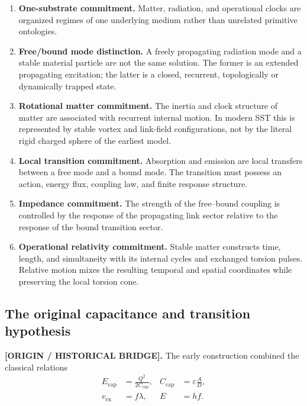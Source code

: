 \documentclass[11pt]{article}
\theoremstyle{definition}
\theoremstyle{plain}
\theoremstyle{remark}
\begin{document}
\begin{enumerate}
    \item \textbf{One-substrate commitment.}
    Matter, radiation, and operational clocks are organized regimes of one
    underlying medium rather than unrelated primitive ontologies.

    \item \textbf{Free/bound mode distinction.}
    A freely propagating radiation mode and a stable material particle are not
    the same solution. The former is an extended propagating excitation; the
    latter is a closed, recurrent, topologically or dynamically trapped state.

    \item \textbf{Rotational matter commitment.}
    The inertia and clock structure of matter are associated with recurrent
    internal motion. In modern SST this is represented by stable vortex and
    link-field configurations, not by the literal rigid charged sphere of the
    earliest model.

    \item \textbf{Local transition commitment.}
    Absorption and emission are local transfers between a free mode and a bound
    mode. The transition must possess an action, energy flux, coupling law, and
    finite response structure.

    \item \textbf{Impedance commitment.}
    The strength of the free--bound coupling is controlled by the response of
    the propagating link sector relative to the response of the bound
    transition sector.

    \item \textbf{Operational relativity commitment.}
    Stable matter constructs time, length, and simultaneity with its internal
    cycles and exchanged torsion pulses. Relative motion mixes the resulting
    temporal and spatial coordinates while preserving the local torsion cone.
\end{enumerate}

\subsection{The original capacitance and transition hypothesis}
\label{subsec:original_capacitance_transition_hypothesis}

\textbf{[ORIGIN / HISTORICAL BRIDGE].}
The early construction combined the classical relations
\begin{align}
    E_{\mathrm{cap}}
    &=
    \frac{Q^2}{2C_{\mathrm{cap}}},
    &
    C_{\mathrm{cap}}
    &=
    \varepsilon\frac{A}{D},
    \label{eq:origin_capacitance_pair}
    \\
    v_{\mathrm{ex}}
    &=
    f\lambda,
    &
    E
    &=
    hf.
    \label{eq:origin_speed_planck_pair}
\end{align}
\end{document}
